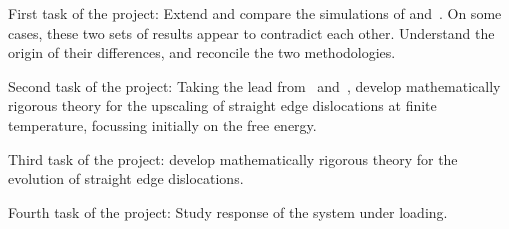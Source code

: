 \begin{workpackage}[id=WPkinetic,title=Kinetic control,wphases=1-48]
\begin{tasklist}


  \begin{task}[title=Reconcile the simulations]
    First task of the project: Extend and compare the simulations of \cite[Ch.~9]{VanMeurs15TH} and~\cite[Ch.~6]{Kooiman15TH}. On some cases, these two sets of results appear to contradict each other. Understand the origin of their differences, and reconcile the two methodologies.
  \end{task}

  \begin{task}[title=Upscaling the energy]
    Second task of the project: Taking the lead from~\cite[Ch.~2]{Kooiman15TH} and~\cite{SandierSerfaty12TR}, develop mathematically rigorous theory for the upscaling of straight edge dislocations at finite temperature, focussing initially on the free energy. 
  \end{task}
  
  \begin{task}[title=Upscaling the evolution]
    Third task of the project: develop mathematically rigorous theory for the evolution of straight edge dislocations. 
  \end{task}
  
  \begin{task}[title=Response]
    Fourth task of the project: Study response of the system under loading. 
  \end{task}
  
\end{tasklist}

\begin{wpdelivs}
\end{wpdelivs}
\end{workpackage}
